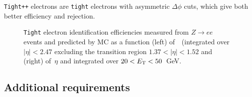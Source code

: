 \texttt{Tight++} electrons are \texttt{tight} electrons with asymmetric $\Delta\phi$ cuts, which give
both better efficiency and rejection.

\begin{figure}[tb]\begin{center}
	\caption{\texttt{Tight} electron identification efficiencies measured from $Z\to ee$ events and predicted by MC as a function (left) of~\ET\ (integrated over $|\eta|< 2.47$ excluding the transition region $1.37< |\eta|<1.52$ and (right) of~$\eta$ and integrated over $20< \ET<50$~GeV.~\cite{eperf}\label{fig:eleeff}}
\end{center}\end{figure}


\tocless\subsection{Additional requirements}\label{sec:REQtrigger}

